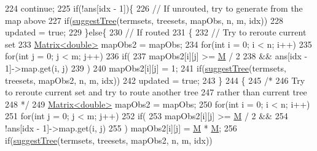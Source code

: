 \begin{DoxyCode}
224                 \textcolor{keywordflow}{continue};
225             \textcolor{keywordflow}{if}(!ans[idx - 1])\{
226                 \textcolor{comment}{// If unrouted, try to generate from the map above}
227                 \textcolor{keywordflow}{if}(\hyperlink{classColumnGenSolve_a4ec729b2184612495e657f7ec2d644fa}{suggestTree}(termsets, treesets, mapObs, n, m, idx))
228                     updated = \textcolor{keyword}{true};
229             \}\textcolor{keywordflow}{else}\{
230                 \textcolor{comment}{// If routed}
231                 \{
232                     \textcolor{comment}{// Try to reroute current set}
233                     \hyperlink{classMatrix}{Matrix<double>} mapObs2 = mapObs;
234                     \textcolor{keywordflow}{for}(\textcolor{keywordtype}{int} i = 0; i < n; i++)
235                         \textcolor{keywordflow}{for}(\textcolor{keywordtype}{int} j = 0; j < m; j++)
236                             \textcolor{keywordflow}{if}(
237                                 mapObs2[i][j] >= \hyperlink{classColumnGenSolve_ac5abb4d6dfd291b01af6ea006b5f9f5d}{M} / 2
238                                 && ans[idx - 1]->map.get(i, j)
239                             )
240                                 mapObs2[i][j] = 1;
241                     \textcolor{keywordflow}{if}(\hyperlink{classColumnGenSolve_a4ec729b2184612495e657f7ec2d644fa}{suggestTree}(termsets, treesets, mapObs2, n, m, idx))
242                         updated = \textcolor{keyword}{true};
243                 \}
244                 \{
245                     \textcolor{comment}{/*}
246 \textcolor{comment}{                        Try to reroute current set and try to route another tree}
247 \textcolor{comment}{                        rather than current tree}
248 \textcolor{comment}{                    */}
249                     \hyperlink{classMatrix}{Matrix<double>} mapObs2 = mapObs;
250                     \textcolor{keywordflow}{for}(\textcolor{keywordtype}{int} i = 0; i < n; i++)
251                         \textcolor{keywordflow}{for}(\textcolor{keywordtype}{int} j = 0; j < m; j++)
252                             \textcolor{keywordflow}{if}(
253                                 mapObs2[i][j] >= \hyperlink{classColumnGenSolve_ac5abb4d6dfd291b01af6ea006b5f9f5d}{M} / 2 &&
254                                 !ans[idx - 1]->map.get(i, j)
255                             ) mapObs2[i][j] = \hyperlink{classColumnGenSolve_ac5abb4d6dfd291b01af6ea006b5f9f5d}{M} * \hyperlink{classColumnGenSolve_ac5abb4d6dfd291b01af6ea006b5f9f5d}{M};
256                     \textcolor{keywordflow}{if}(\hyperlink{classColumnGenSolve_a4ec729b2184612495e657f7ec2d644fa}{suggestTree}(termsets, treesets, mapObs2, n, m, idx))

\end{DoxyCode}
